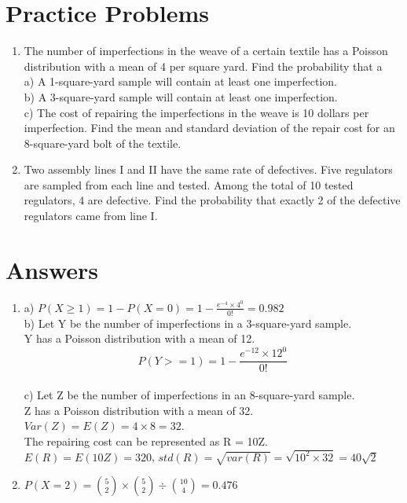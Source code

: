 \documentclass[11pt]{article}
\begin{document}
\section{Practice Problems}
\begin{enumerate}
  \item The number of imperfections in the weave of a certain textile has a Poisson distribution with a mean of 4 per square yard. Find the probability that a
  \\ a) A 1-square-yard sample will contain at least one imperfection. %
  \\ b) A 3-square-yard sample will contain at least one imperfection. %
  \\ c) The cost of repairing the imperfections in the weave is 10 dollars per imperfection. Find the mean and standard deviation of the repair cost for an 8-square-yard bolt of the textile.
  \item Two assembly lines I and II have the same rate of defectives. Five regulators are sampled from each line and tested. Among the total of 10 tested regulators, 4 are defective. Find the probability that exactly 2 of the defective regulators came from line I.
\end{enumerate}

\section{Answers}
\begin{enumerate}
  \item a) $P(X \geq 1) = 1 - P(X = 0) = 1 - \frac{e^{-4} \times 4^0}{0!} = 0.982$
  \\ b) Let Y be the number of imperfections in a 3-square-yard sample. 
  \\ Y has a Poisson distribution with a mean of 12.
  $$P(Y >= 1) = 1 - \frac{e^{-12} \times 12^0}{0!}$$
  \\ c) Let Z be the number of imperfections in an 8-square-yard sample. 
  \\ Z has a Poisson distribution with a mean of 32.
  \\ $Var(Z) = E(Z) = 4 \times 8 = 32$. 
  \\ The repairing cost can be represented as R = 10Z. 
  \\ $E(R) = E(10Z) = 320$, $std(R) = \sqrt{var(R)} = \sqrt{10^2 \times 32} = 40\sqrt{2}$
  \item $P(X=2) = {5 \choose 2} \times {5 \choose 2} \div {10 \choose 4}  = 0.476$
\end{enumerate}
\end{document}
